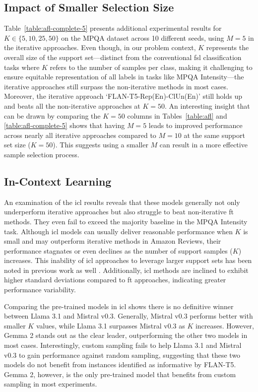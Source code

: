 \documentclass[11pt]{article}
\theoremstyle{definition}
\begin{document}
\subsection{Impact of Smaller Selection Size}

Table~{\ref{table:afl-complete-5}} presents additional experimental results for $K \in \{5, 10, 25, 50\}$ on the MPQA dataset across 10 different seeds, using $M=5$ in the iterative approaches. Even though, in our problem context, $K$ represents the overall size of the support set—distinct from the conventional \gls*{fsl} classification tasks where $K$ refers to the number of samples per class, making it challenging to ensure equitable representation of all labels in tasks like MPQA Intensity—the iterative approaches still surpass the non-iterative methods in most cases. Moreover, the iterative approach `FLAN-T5-Rep(En)-ClUn(En)' still holds up and beats all the non-iterative approaches at $K=50$. An interesting insight that can be drawn by comparing the $K=50$ columns in Tables~\ref{table:afl} and \ref{table:afl-complete-5} shows that having $M=5$ leads to improved performance across nearly all iterative approaches compared to $M=10$ at the same support set size ($K=50$). This suggests using a smaller $M$ can result in a more effective sample selection process.

\subsection{In-Context Learning}

An examination of the \gls*{icl} results reveals that these models generally not only underperform iterative approaches but also struggle to beat non-iterative \gls*{ft} methods.
They even fail to exceed the majority baseline in the MPQA Intensity task.
Although \gls*{icl} models can usually deliver reasonable performance when $K$ is small and may outperform iterative methods in Amazon Reviews, their performance stagnates or even declines as the number of support samples ($K$) increases.
This inability of \gls*{icl} approaches to leverage larger support sets has been noted in previous work as well \cite{pecher2024automatic}.
Additionally, \gls*{icl} methods are inclined to exhibit higher standard deviations compared to \gls*{ft} approaches, indicating greater performance variability.

Comparing the pre-trained models in \gls*{icl} shows there is no definitive winner between Llama 3.1 and Mistral v0.3. Generally, Mistral v0.3 performs better with smaller $K$ values, while Llama 3.1 surpasses Mistral v0.3 as $K$ increases.
However, Gemma 2 stands out as the clear leader, outperforming the other two models in most cases.
Interestingly, custom sampling fails to help Llama 3.1 and Mistral v0.3 to gain performance against random sampling, suggesting that these two models do not benefit from instances identified as informative by FLAN-T5.
Gemma 2, however, is the only pre-trained model that benefits from custom sampling in most experiments. 
\end{document}
